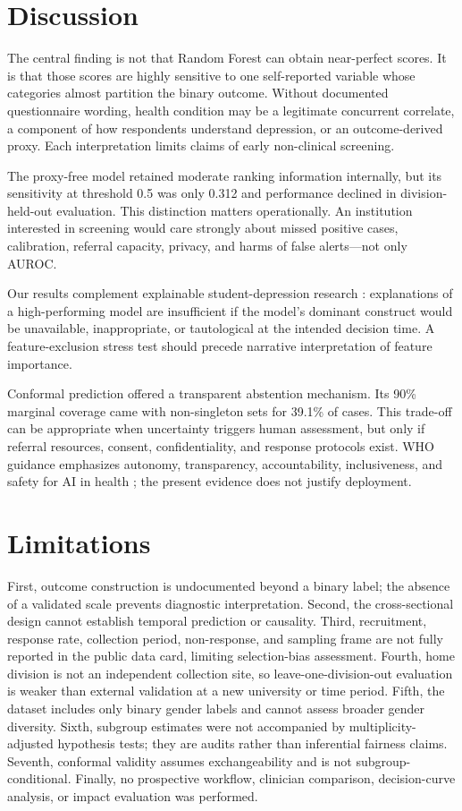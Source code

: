 \documentclass[conference]{IEEEtran}
\begin{document}
\section{Discussion}
The central finding is not that Random Forest can obtain near-perfect scores. It is that those scores are highly sensitive to one self-reported variable whose categories almost partition the binary outcome. Without documented questionnaire wording, health condition may be a legitimate concurrent correlate, a component of how respondents understand depression, or an outcome-derived proxy. Each interpretation limits claims of early non-clinical screening.

The proxy-free model retained moderate ranking information internally, but its sensitivity at threshold 0.5 was only 0.312 and performance declined in division-held-out evaluation. This distinction matters operationally. An institution interested in screening would care strongly about missed positive cases, calibration, referral capacity, privacy, and harms of false alerts---not only AUROC.

Our results complement explainable student-depression research \cite{chang2026interpretable,isiwu2026multilevel}: explanations of a high-performing model are insufficient if the model's dominant construct would be unavailable, inappropriate, or tautological at the intended decision time. A feature-exclusion stress test should precede narrative interpretation of feature importance.

Conformal prediction offered a transparent abstention mechanism. Its 90\% marginal coverage came with non-singleton sets for 39.1\% of cases. This trade-off can be appropriate when uncertainty triggers human assessment, but only if referral resources, consent, confidentiality, and response protocols exist. WHO guidance emphasizes autonomy, transparency, accountability, inclusiveness, and safety for AI in health \cite{who2021ethics}; the present evidence does not justify deployment.

\section{Limitations}
First, outcome construction is undocumented beyond a binary label; the absence of a validated scale prevents diagnostic interpretation. Second, the cross-sectional design cannot establish temporal prediction or causality. Third, recruitment, response rate, collection period, non-response, and sampling frame are not fully reported in the public data card, limiting selection-bias assessment. Fourth, home division is not an independent collection site, so leave-one-division-out evaluation is weaker than external validation at a new university or time period. Fifth, the dataset includes only binary gender labels and cannot assess broader gender diversity. Sixth, subgroup estimates were not accompanied by multiplicity-adjusted hypothesis tests; they are audits rather than inferential fairness claims. Seventh, conformal validity assumes exchangeability and is not subgroup-conditional. Finally, no prospective workflow, clinician comparison, decision-curve analysis, or impact evaluation was performed.
\end{document}
